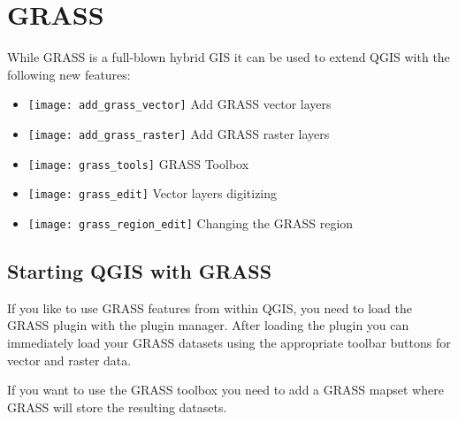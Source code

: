 \section{GRASS}\label{sec:grass}

While GRASS\cite{GRASSweb} is a full-blown hybrid GIS it can be used to extend
QGIS with the following new features:

\begin{itemize}
\item \texttt{[image: add\_grass\_vector]} Add GRASS vector layers
\item \texttt{[image: add\_grass\_raster]} Add GRASS raster layers
\item \texttt{[image: grass\_tools]} GRASS Toolbox
\item \texttt{[image: grass\_edit]} Vector layers digitizing
\item \texttt{[image: grass\_region\_edit]} Changing the GRASS region
\end{itemize}

\subsection{Starting QGIS with GRASS}\label{sec:starting_grass}

If you like to use GRASS features from within QGIS, you need to load the 
GRASS plugin with the plugin manager. 
After loading the plugin you can immediately load your GRASS datasets using 
the appropriate toolbar buttons for vector and raster data.

If you want to use the GRASS toolbox you need to add a GRASS mapset where GRASS
will store the resulting datasets.

